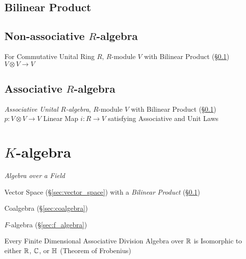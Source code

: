 \subsection{Bilinear Product}\label{sec:bilinear_product}

\subsection{Non-associative $R$-algebra}
\label{sec:nonassociative_r_algebra}

For Commutative Unital Ring $R$, $R$-module $V$ with Bilinear Product
(\S\ref{sec:bilinear_product}) $V \otimes V \rightarrow V$



\subsection{Associative $R$-algebra}\label{sec:associative_r_algebra}

\emph{Associative Unital $R$-algebra}, $R$-module $V$ with Bilinear
Product (\S\ref{sec:bilinear_product}) $p : V \otimes V \rightarrow V$
Linear Map $i : R \rightarrow V$ satisfying Associative and Unit Laws



\section{$K$-algebra}\label{sec:k_algebra}

\emph{Algebra over a Field}

Vector Space (\S\ref{sec:vector_space}) with a \emph{Bilinear Product}
(\S\ref{sec:bilinear_product})

Coalgebra (\S\ref{sec:coalgebra})

$F$-algebra (\S\ref{sec:f_algebra})

Every Finite Dimensional Associative Division Algebra over $\mathbb{R}$ is
Isomorphic to either $\mathbb{R}$, $\mathbb{C}$, or $\mathbb{H}$ (Theorem of
Frobenius) %



